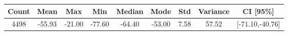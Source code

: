 \begin{tabular}{|c|c|c|c|c|c|c|c|c|}\hline
\rowcolor{Plum!20}
Count&Mean&Max&Min&Median&Mode&Std&Variance&CI [95\%]\\\hline\hline
4498&-55.93&-21.00&-77.60&-64.40&-53.00&7.58&57.52&[-71.10,-40.76]\\\hline
\end{tabular}
